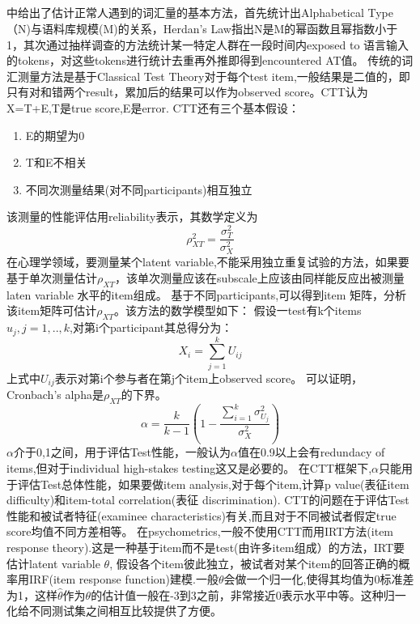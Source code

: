 \documentclass[12pt]{article}
\begin{document}
\subsection{\textbf{}}
\cite{Bib4}中给出了估计正常人遇到的词汇量的基本方法，首先统计出Alphabetical Type（N)与语料库规模(M)的关系，Herdan's Law指出N是M的幂函数且幂指数小于1，其次通过抽样调查的方法统计某一特定人群在一段时间内exposed to 语言输入的tokens，对这些tokens进行统计去重再外推即得到encountered AT值。
传统的词汇测量方法是基于Classical Test Theory对于每个test item,一般结果是二值的，即只有对和错两个result，累加后的结果可以作为observed score。CTT认为X=T+E,T是true score,E是error.
CTT还有三个基本假设：
\begin{enumerate}
\item{E的期望为0}
\item{T和E不相关}
\item{不同次测量结果(对不同participants)相互独立}
\end{enumerate}
该测量的性能评估用reliability表示，其数学定义为
\begin{equation}
\rho_{XT}^2=\frac{\sigma_T^2}{\sigma_X^2}
\end{equation}
在心理学领域，要测量某个latent variable,不能采用独立重复试验的方法，如果要基于单次测量估计$\rho_{XT}$，该单次测量应该在subscale上应该由同样能反应出被测量laten variable 水平的item组成。
基于不同participants,可以得到item 矩阵，分析该item矩阵可估计$\rho_{XT}$。该方法的数学模型如下：
假设一test有k个items $u_j,j=1,..,k$,对第i个participant其总得分为：
\begin{equation}
X_i=\sum_{j=1}^k U_{ij}
\end{equation}
上式中$U_{ij}$表示对第i个参与者在第j个item上observed score。
可以证明，Cronbach's alpha是$\rho_{XT}$的下界。
\begin{equation}
\alpha=\frac{k}{k-1}(1-\frac{\sum_{i=1}^k \sigma_{U_j}^2}{\sigma_X^2})
\end{equation}
$\alpha$介于0,1之间，用于评估Test性能，一般认为$\alpha$值在0.9以上会有redundacy of items,但对于individual high-stakes testing这又是必要的。
在CTT框架下,$\alpha$只能用于评估Test总体性能，如果要做item analysis,对于每个item,计算p value(表征item difficulty)和item-total correlation(表征 discrimination).
CTT的问题在于评估Test性能和被试者特征(examinee characteristics)有关,而且对于不同被试者假定true score均值不同方差相等。
在psychometrics,一般不使用CTT而用IRT方法(item response theory).这是一种基于item而不是test(由许多item组成）的方法，IRT要估计latent variable $\theta$,
假设各个item彼此独立，被试者对某个item的回答正确的概率用IRF(item response function)建模.一般$\theta$会做一个归一化,使得其均值为0标准差为1，这样$\hat{\theta}$作为$\theta$的估计值一般在-3到3之前，非常接近0表示水平中等。这种归一化给不同测试集之间相互比较提供了方便。
\end{document}
